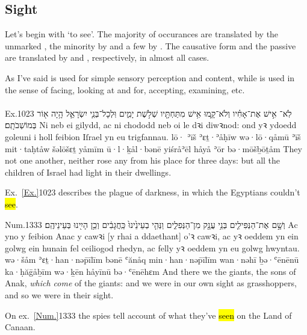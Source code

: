 \subsection{Sight}


\begin{paper}
	{\click} Let’s begin with  ‘to see’. The majority of occurances are translated by the unmarked , the minority by  and a few by . The causative form  and the passive  are translated by  and , respectively, in almost all cases.

	As I’ve said  is used for simple sensory perception and content, while  is used in the sense of facing, looking at and for, accepting, examining, etc.
\end{paper}


\paragraph{}


\begin{example}{Ex.}{10}{23}{}{}
	\quoling
	{לֹֽא־ אִ֣ישׁ אֶת־אָחִ֗יו וְלֹא־קָ֛מוּ אִ֥ישׁ מִתַּחְתָּ֖יו שְׁלֹ֣שֶׁת יָמִ֑ים וּֽלְכָל־בְּנֵ֧י יִשְׂרָאֵ֛ל הָ֥יָה א֖וֹר בְּמוֹשְׁבֹתָֽם׃}
	{Ni  neb ei gilydd, ac ni chododd neb oi le dꝛi diwꝛnod: ond yꝛ ydoedd goleuni i holl feibion Iſrael yn eu trigfannau.}
	{lō· ʾīš ʾɛṯ·ʾåḥīw wə·lō·qåmū ʾīš mit·taḥtåw šəlōšɛṯ yåmīm ū·l·ḵål·bənē yiśråʾēl håyå ʾōr bə·mōšḇōṯåm}
	{They  not one another, neither rose any from his place for three days: but all the children of Israel had light in their dwellings.}
\end{example}
\begin{paper}
	\explain Ex.~\vref{Ex.}{10}{23}{} describes the plague of darkness, in which the Egyptians couldn’t \hl{see}.
\end{paper}

\begin{example}{Num.}{13}{33}{}{}
	\quoling
	{וְשָׁ֣ם  אֶת־הַנְּפִילִ֛ים בְּנֵ֥י עֲנָ֖ק מִן־הַנְּפִלִ֑ים וַנְּהִ֤י בְעֵינֵ֙ינוּ֙ כַּֽחֲגָבִ֔ים וְכֵ֥ן הָיִ֖ינוּ בְּעֵינֵיהֶֽם׃}
	{Ac yno y  feibion Anac y cawꝛi [y rhai a ddaethant] o’ꝛ cawꝛi, ac yꝛ oeddem yn ein golwg ein hunain fel ceiliogod rhedyn, ac felly yꝛ oeddem yn eu golwg hwyntau.}
	{wə·šåm  ʾɛṯ·han·nəp̄īlīm bənē ʿănåq min·han·nəp̄īlīm wan·nəhī ḇə·ʿēnēnū ka·ḥăḡåḇīm wə·ḵēn håyīnū bə·ʿēnēhɛm}
	{And there we  the giants, the sons of Anak, \emph{which come} of the giants: and we were in our own sight as grasshoppers, and so we were in their sight.}
\end{example}
\begin{paper}
	\explain On ex.~\vref{Num.}{13}{33}{} the spies tell account of what they’ve \hl{seen} on the Land of Canaan.
\end{paper}



